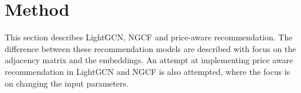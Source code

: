 \section{Method}
This section describes LightGCN, NGCF and price-aware recommendation.
The difference between these recommendation models are described with focus on the adjacency matrix and the embeddings.
An attempt at implementing price aware recommendation in LightGCN and NGCF is also attempted, where the focus is on changing the input parameters.




